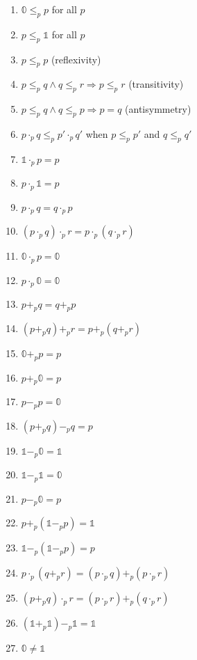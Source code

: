 \documentclass[11pt,a4paper]{article}
\newcommand{\pzero}{\mathbb{0}}
\newcommand{\pone}{\mathbb{1}}
\newcommand{\ple}{\leq_p}
\newcommand{\padd}{+_p}
\newcommand{\pmul}{\cdot_p}
\newcommand{\psub}{-_p}
\begin{document}
\begin{enumerate}
    \item $\pzero \ple p$ for all $p$
    \item $p \ple \pone$ for all $p$
    \item $p \ple p$ (reflexivity)
    \item $p \ple q \land q \ple r \Rightarrow p \ple r$ (transitivity)
    \item $p \ple q \land q \ple p \Rightarrow p = q$ (antisymmetry)
    \item $p \pmul q \ple p' \pmul q'$ when $p \ple p'$ and $q \ple q'$
    \item $\pone \pmul p = p$
    \item $p \pmul \pone = p$
    \item $p \pmul q = q \pmul p$
    \item $(p \pmul q) \pmul r = p \pmul (q \pmul r)$
    \item $\pzero \pmul p = \pzero$
    \item $p \pmul \pzero = \pzero$
    \item $p \padd q = q \padd p$
    \item $(p \padd q) \padd r = p \padd (q \padd r)$
    \item $\pzero \padd p = p$
    \item $p \padd \pzero = p$
    \item $p \psub p = \pzero$
    \item $(p \padd q) \psub q = p$
    \item $\pone \psub \pzero = \pone$
    \item $\pone \psub \pone = \pzero$
    \item $p \psub \pzero = p$
    \item $p \padd (\pone \psub p) = \pone$
    \item $\pone \psub (\pone \psub p) = p$
    \item $p \pmul (q \padd r) = (p \pmul q) \padd (p \pmul r)$
    \item $(p \padd q) \pmul r = (p \pmul r) \padd (q \pmul r)$
    \item $(\pone \padd \pone) \psub \pone = \pone$
    \item $\pzero \neq \pone$
\end{enumerate}


\end{document}
